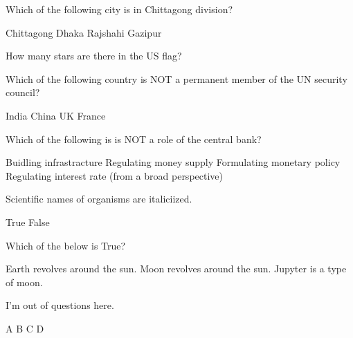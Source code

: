 \documentclass[12pt]{exam}
\begin{document}
\begin{questions}
        \question Which of the following city is in Chittagong division?  
        \begin{oneparchoices}
            \CorrectChoice Chittagong
            \choice Dhaka
            \choice Rajshahi
            \choice Gazipur
        \end{oneparchoices} 

        \question How many stars are there in the US flag?   
        \begin{oneparchoices}
        \end{oneparchoices} 

        \question Which of the following country is NOT a permanent member of the 
        UN security council?   
        \begin{oneparchoices}
            \CorrectChoice India  
            \choice China
            \choice UK
            \choice France
        \end{oneparchoices} 

        \question Which of the following is is NOT a role of the central bank?   
        \begin{oneparchoices}
            \CorrectChoice Buidling infrastracture  
            \choice Regulating money supply
            \choice Formulating monetary policy
            \choice Regulating interest rate (from a broad perspective)
        \end{oneparchoices} 

        \question Scientific names of organisms are italiciized.   
        \begin{oneparchoices}
            \CorrectChoice True  
            \choice False
        \end{oneparchoices} 

        \question Which of the below is True?   
        \begin{oneparchoices}
            \CorrectChoice Earth revolves around the sun.  
            \choice Moon revolves around the sun.
            \choice Jupyter is a type of moon.

        \end{oneparchoices} 

        \question I'm out of questions here.   
        \begin{oneparchoices}
            \CorrectChoice A  
            \choice B
            \choice C
            \choice D
        \end{oneparchoices} 


\end{questions}
\end{document}
